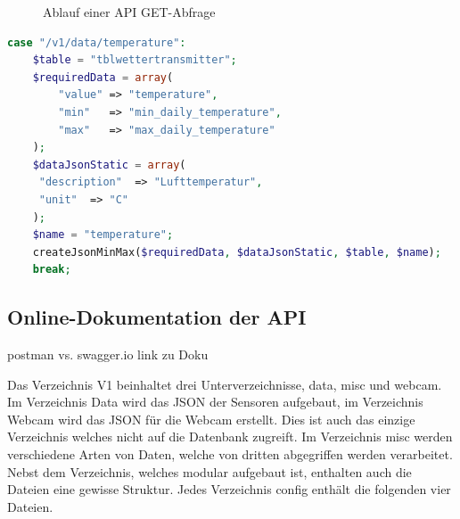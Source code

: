 \begin{figure}[h!]
	\centering
	\caption{Ablauf einer API GET-Abfrage}
	\label{img:APIFiles}
\end{figure}



\begin{lstlisting}[label=lst:path,caption=Beispiel Case zuweisung, language=php, style=php]
case "/v1/data/temperature":
	$table = "tblwettertransmitter";
	$requiredData = array(
		"value" => "temperature",
		"min"  	=> "min_daily_temperature",
		"max"   => "max_daily_temperature"
	);
	$dataJsonStatic = array(
	 "description"  => "Lufttemperatur",
	 "unit"  => "C"
	);
	$name = "temperature";
	createJsonMinMax($requiredData, $dataJsonStatic, $table, $name);
	break;
\end{lstlisting}



\subsection{Online-Dokumentation der API}
postman vs. swagger.io
link zu Doku

Das Verzeichnis V1 beinhaltet drei Unterverzeichnisse, data, misc und webcam. Im Verzeichnis Data wird das JSON der Sensoren aufgebaut, im Verzeichnis Webcam wird das JSON für die Webcam erstellt. Dies ist auch das einzige Verzeichnis welches nicht auf die Datenbank zugreift. Im Verzeichnis misc werden verschiedene Arten von Daten, welche von dritten abgegriffen werden verarbeitet. Nebst dem Verzeichnis, welches modular aufgebaut ist, enthalten auch die Dateien eine gewisse Struktur. Jedes Verzeichnis config enthält die folgenden vier Dateien.


